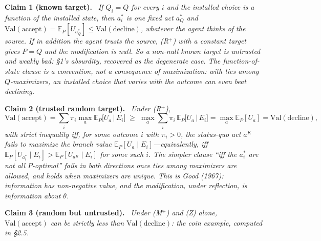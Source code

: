 \documentclass[11pt,a4paper]{article}
\newcommand{\E}{\mathbb{E}}
\newcommand{\Val}{\mathrm{Val}}
\newcommand{\accept}{\text{accept}}
\newcommand{\decline}{\text{decline}}
\newenvironment{stmt}[2]{\par\medskip\noindent\textbf{#1 #2.}\ \itshape\ignorespaces}{\par\medskip}
\begin{document}
\begin{stmt}{Claim}{1 (known target)}
If $Q_i = Q$ for every $i$ and the installed choice is a function of the installed state, then $a^*_i$ is one fixed act $a^*_Q$ and $\Val(\accept) = \E_P[U_{a^*_Q}] \le \Val(\decline)$, whatever the agent thinks of the source. If in addition the agent trusts the source, (R$^+$) with a constant target gives $P = Q$ and the modification is null. So a non-null known target is untrusted and weakly bad: \S1's absurdity, recovered as the degenerate case. The function-of-state clause is a convention, not a consequence of maximization: with ties among $Q$-maximizers, an installed choice that varies with the outcome can even beat declining.
\end{stmt}

\begin{stmt}{Claim}{2 (trusted random target)}
Under (R$^+$),
\[
\Val(\accept) = \sum_i \pi_i \max_a \E_P\bigl[U_a \,\big|\, E_i\bigr] \;\ge\; \max_a \sum_i \pi_i\, \E_P\bigl[U_a \,\big|\, E_i\bigr] = \max_a \E_P[U_a] = \Val(\decline),
\]
with strict inequality iff, for some outcome $i$ with $\pi_i > 0$, the status-quo act $a^K$ fails to maximize the branch value $\mathbb E_P[U_a \mid E_i]$---equivalently, iff $\mathbb E_P[U_{a^*_i} \mid E_i] > \mathbb E_P[U_{a^K} \mid E_i]$ for some such $i$. The simpler clause ``iff the $a^*_i$ are not all $P$-optimal'' fails in both directions once ties among maximizers are allowed, and holds when maximizers are unique. This is Good (1967): information has non-negative value, and the modification, under reflection, is information about $\theta$.
\end{stmt}

\begin{stmt}{Claim}{3 (random but untrusted)}
Under (M$^+$) and (Z) alone, $\Val(\accept)$ can be strictly less than $\Val(\decline)$: the coin example, computed in \S2.5.
\end{stmt}
\end{document}
